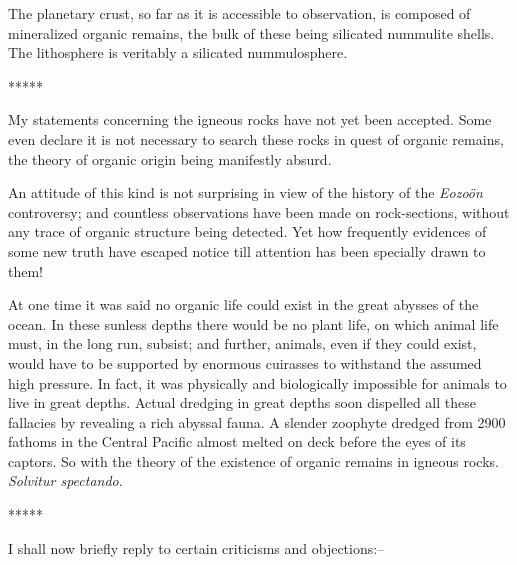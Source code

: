 \documentclass[a4paper, 12pt, oneside, landscape]{article}
\begin{document}
The planetary crust, so far as it is accessible to observation, is composed of mineralized organic remains, the bulk of these being silicated nummulite shells. The lithosphere is veritably a silicated nummulosphere.

\centerline{*\hspace{15mm}*\hspace{15mm}*\hspace{15mm}*\hspace{15mm}*}
\bigskip

My statements concerning the igneous rocks have not yet been accepted. Some even declare it is not necessary to search these rocks in quest of organic remains, the theory of organic origin being manifestly absurd.

An attitude of this kind is not surprising in view of the history of the \emph{Eozoön} controversy; and countless observations have been made on rock-sections, without any trace of organic structure being detected. Yet how frequently evidences of some new truth have escaped notice till attention has been specially drawn to them!

At one time it was said no organic life could exist in the great abysses of the ocean. In these sunless depths there would be no plant life, on which animal life must, in the long run, subsist; and further, animals, even if they could exist, would have to be supported by enormous cuirasses to withstand the assumed high pressure. In fact, it was physically and biologically impossible for animals to live in great depths. Actual dredging in great depths soon dispelled all these fallacies by revealing a rich abyssal fauna. A slender zoophyte dredged from 2900 fathoms in the Central Pacific almost melted on deck before the eyes of its captors. So with the theory of the existence of organic remains in igneous rocks. \emph{Solvitur spectando}.

\centerline{*\hspace{15mm}*\hspace{15mm}*\hspace{15mm}*\hspace{15mm}*}
\bigskip

I shall now briefly reply to certain criticisms and objections:--
\end{document}
